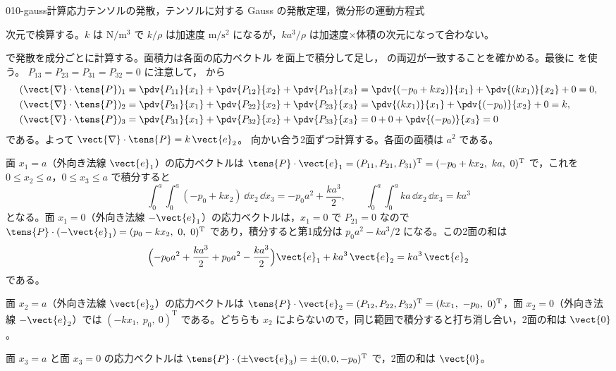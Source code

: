 \documentclass[uplatex,dvipdfmx,a4paper,11pt]{jsarticle}
\begin{document}
\begin{mondai}{010-gauss}{計算}{応力テンソルの発散，テンソルに対する Gauss の発散定理，微分形の運動方程式}
\begin{kizuki}
\item 次元で検算する。$k$ は $\unit{\newton\per\metre\cubed}$ で $k/\rho$ は加速度 $\unit{\metre\per\second\squared}$ になるが，$ka^{3}/\rho$ は加速度×体積の次元になって合わない。
\end{kizuki}
\begin{tadashii}
\houshin {} で発散を成分ごとに計算する。面積力は各面の応力ベクトル  を面上で積分して足し， の両辺が一致することを確かめる。最後に  を使う。
\keisan {} $P_{13}=P_{23}=P_{31}=P_{32}=0$ に注意して， から
\begin{align*}
(\vect{\nabla}\cdot\tens{P})_1&=\pdv{P_{11}}{x_1}+\pdv{P_{12}}{x_2}+\pdv{P_{13}}{x_3}=\pdv{(-p_0+kx_2)}{x_1}+\pdv{(kx_1)}{x_2}+0=0,\\
(\vect{\nabla}\cdot\tens{P})_2&=\pdv{P_{21}}{x_1}+\pdv{P_{22}}{x_2}+\pdv{P_{23}}{x_3}=\pdv{(kx_1)}{x_1}+\pdv{(-p_0)}{x_2}+0=k,\\
(\vect{\nabla}\cdot\tens{P})_3&=\pdv{P_{31}}{x_1}+\pdv{P_{32}}{x_2}+\pdv{P_{33}}{x_3}=0+0+\pdv{(-p_0)}{x_3}=0
\end{align*}
である。よって $\vect{\nabla}\cdot\tens{P}=k\,\vect{e}_2$。
 向かい合う2面ずつ計算する。各面の面積は $a^{2}$ である。

面 $x_1=a$（外向き法線 $\vect{e}_1$）の応力ベクトルは $\tens{P}\cdot\vect{e}_1=(P_{11},P_{21},P_{31})^{\mathrm{T}}=(-p_0+kx_2,\ ka,\ 0)^{\mathrm{T}}$ で，これを $0\le x_2\le a$，$0\le x_3\le a$ で積分すると
\[ \int_0^a\!\!\int_0^a(-p_0+kx_2)\,\dd x_2\,\dd x_3=-p_0a^{2}+\frac{ka^{3}}{2},\qquad \int_0^a\!\!\int_0^a ka\,\dd x_2\,\dd x_3=ka^{3} \]
となる。面 $x_1=0$（外向き法線 $-\vect{e}_1$）の応力ベクトルは，$x_1=0$ で $P_{21}=0$ なので $\tens{P}\cdot(-\vect{e}_1)=(p_0-kx_2,\ 0,\ 0)^{\mathrm{T}}$ であり，積分すると第1成分は $p_0a^{2}-ka^{3}/2$ になる。この2面の和は
\[ \Bigl(-p_0a^{2}+\frac{ka^{3}}{2}+p_0a^{2}-\frac{ka^{3}}{2}\Bigr)\vect{e}_1+ka^{3}\,\vect{e}_2=ka^{3}\,\vect{e}_2 \]
である。

面 $x_2=a$（外向き法線 $\vect{e}_2$）の応力ベクトルは $\tens{P}\cdot\vect{e}_2=(P_{12},P_{22},P_{32})^{\mathrm{T}}=(kx_1,\ -p_0,\ 0)^{\mathrm{T}}$，面 $x_2=0$（外向き法線 $-\vect{e}_2$）では $(-kx_1,\ p_0,\ 0)^{\mathrm{T}}$ である。どちらも $x_2$ によらないので，同じ範囲で積分すると打ち消し合い，2面の和は $\vect{0}$。

面 $x_3=a$ と面 $x_3=0$ の応力ベクトルは $\tens{P}\cdot(\pm\vect{e}_3)=\pm(0,0,-p_0)^{\mathrm{T}}$ で，2面の和は $\vect{0}$。


\end{tadashii}
\end{mondai}
\end{document}
